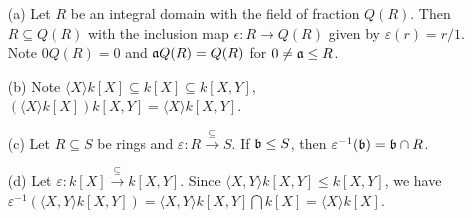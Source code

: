 \begin{example}\label{1.62}
    \begin{enumerate}
        \item[(a)] Let $R$ be an integral domain with the field of fraction $Q(R)$. Then $R \subseteq Q(R)$ with the inclusion map $\epsilon:R \to Q(R)$ given by $\varepsilon(r) = r/1$. Note $0Q(R) = 0$ and $\mathfrak{a} Q(R) = Q(R)$ for $0 \neq \mathfrak{a} \leq R$.
        \item[(b)] Note $\langle X\rangle k[X] \subseteq k[X] \subseteq k[X,Y]$, $\left(\langle X \rangle k[X]\right)k[X,Y] = \langle X \rangle k[X,Y]$.
        \item[(c)] Let $R \subseteq S$ be rings and $\varepsilon: R \xrightarrow \subseteq S$. If $\mathfrak{b} \leq S$, then $\varepsilon^{-1}(\mathfrak{b}) = \mathfrak{b} \cap R$.
        \item[(d)] Let $\varepsilon : k[X] \xrightarrow{\subseteq} k[X,Y]$. Since $\langle X,Y \rangle k[X,Y] \leq k[X,Y]$, we have $\varepsilon^{-1}(\langle X,Y \rangle k[X,Y]) = \langle X,Y \rangle k[X,Y] \textstyle \bigcap k[X] = \langle X \rangle k[X]$.
    \end{enumerate}
\end{example}

